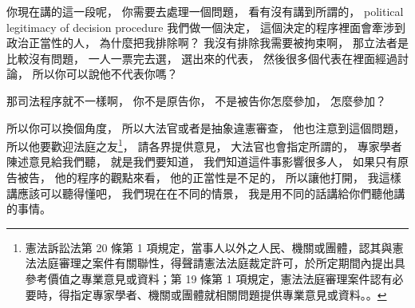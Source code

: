 \hypertarget{w06:cue:2714}{}你現在講的這一段呢，
\hypertarget{w06:cue:2715}{}你需要去處理一個問題，
\hypertarget{w06:cue:2716}{}看有沒有講到所謂的，
\hypertarget{w06:cue:2717}{}political legitimacy of decision procedure
\hypertarget{w06:cue:2718}{}我們做一個決定，
\hypertarget{w06:cue:2719}{}這個決定的程序裡面會牽涉到政治正當性的人，
\hypertarget{w06:cue:2720}{}為什麼把我排除啊？
\hypertarget{w06:cue:2721}{}我沒有排除我需要被拘束啊，
\hypertarget{w06:cue:2722}{}那立法者是比較沒有問題，
\hypertarget{w06:cue:2723}{}一人一票完去選，
\hypertarget{w06:cue:2724}{}選出來的代表，
\hypertarget{w06:cue:2725}{}然後很多個代表在裡面經過討論，
\hypertarget{w06:cue:2726}{}所以你可以說他不代表你嗎？

\hypertarget{w06:cue:2727}{}那司法程序就不一樣啊，
\hypertarget{w06:cue:2728}{}你不是原告你，
\hypertarget{w06:cue:2729}{}不是被告你怎麼參加，
\hypertarget{w06:cue:2730}{}怎麼參加？

\hypertarget{w06:cue:2731}{}所以你可以換個角度，
\hypertarget{w06:cue:2732}{}所以大法官或者是抽象違憲審查，
\hypertarget{w06:cue:2733}{}他也注意到這個問題，
\hypertarget{w06:cue:2734}{}所以他要歡迎法庭之友\footnote{憲法訴訟法第 20 條第 1 項規定，當事人以外之人民、機關或團體，認其與憲法法庭審理之案件有關聯性，得聲請憲法法庭裁定許可，於所定期間內提出具參考價值之專業意見或資料；第 19 條第 1 項規定，憲法法庭審理案件認有必要時，得指定專家學者、機關或團體就相關問題提供專業意見或資料。\cite[第 19 條、第 20 條]{csfa}。}，
\hypertarget{w06:cue:2735}{}請各界提供意見，
\hypertarget{w06:cue:2736}{}大法官也會指定所謂的，
\hypertarget{w06:cue:2737}{}專家學者陳述意見給我們聽，
\hypertarget{w06:cue:2738}{}就是我們要知道，
\hypertarget{w06:cue:2739}{}我們知道這件事影響很多人，
\hypertarget{w06:cue:2740}{}如果只有原告被告，
\hypertarget{w06:cue:2741}{}他的程序的觀點來看，
\hypertarget{w06:cue:2742}{}他的正當性是不足的，
\hypertarget{w06:cue:2743}{}所以讓他打開，
\hypertarget{w06:cue:2744}{}我這樣講應該可以聽得懂吧，
\hypertarget{w06:cue:2745}{}我們現在在不同的情景，
\hypertarget{w06:cue:2746}{}我是用不同的話講給你們聽他講的事情。

